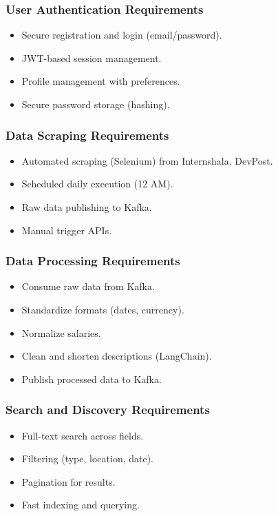 \documentclass[12pt, a4paper]{report}
\begin{document}
\subsubsection{User Authentication Requirements}
\begin{itemize}
    \item Secure registration and login (email/password).
    \item JWT-based session management.
    \item Profile management with preferences.
    \item Secure password storage (hashing).
\end{itemize}

\subsubsection{Data Scraping Requirements}
\begin{itemize}
    \item Automated scraping (Selenium) from Internshala, DevPost.
    \item Scheduled daily execution (12 AM).
    \item Raw data publishing to Kafka.
    \item Manual trigger APIs.
\end{itemize}

\subsubsection{Data Processing Requirements}
\begin{itemize}
    \item Consume raw data from Kafka.
    \item Standardize formats (dates, currency).
    \item Normalize salaries.
    \item Clean and shorten descriptions (LangChain).
    \item Publish processed data to Kafka.
\end{itemize}

\subsubsection{Search and Discovery Requirements}
\begin{itemize}
    \item Full-text search across fields.
    \item Filtering (type, location, date).
    \item Pagination for results.
    \item Fast indexing and querying.
\end{itemize}
\end{document}
